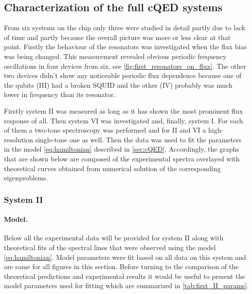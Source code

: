 \documentclass[12pt, twoside]{report}
\numberwithin{equation}{section}
\begin{document}
\subsection{Characterization of the full cQED systems}

From six systems on the chip only three were studied in detail partly due to lack of time and partly because the overall picture was more or less clear at that point. Firstly the behaviour of the resonators was investigated when the flux bias was being changed. This measurement revealed obvious periodic frequency oscillations in four devices from six, see \autoref{fig:first_resonators_on_flux}. The other two devices didn't show any noticeable periodic flux dependence because one of the qubits (III) had a broken SQUID and the other (IV) probably was much lower in frequency than its resonator.

Firstly system II was measured as long as it has shown the most prominent flux response of all. Then system VI was investigated and, finally, system I. For each of them a two-tone spectroscopy was performed and for II and VI a high-resolution single-tone one as well. Then the data was used to fit the parameters in the model \eqref{eq:hamiltonian} described in \autoref{sec:cQED}. Accordingly, the graphs that are shown below are composed of the experimental spectra overlayed with theoretical curves obtained from numerical solution of the corresponding eigenproblems.

\subsubsection{System II}

\paragraph{Model.} Below all the experimental data will be provided for system II along with theoretical fits of the spectral lines that were observed using the model \eqref{eq:hamiltonian}. Model parameters were fit based on all data on this system and are same for all figures in this section. Before turning to the comparison of the theoretical predictions and experimental results it would be useful to present the model parameters used for fitting which are summarized in \autoref{tab:first_II_params}.
\end{document}
